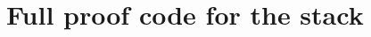 \documentclass[sigplan,screen,review,anonymous]{acmart}
\begin{document}




\appendix

\section{Full proof code for the stack}
\end{document}
